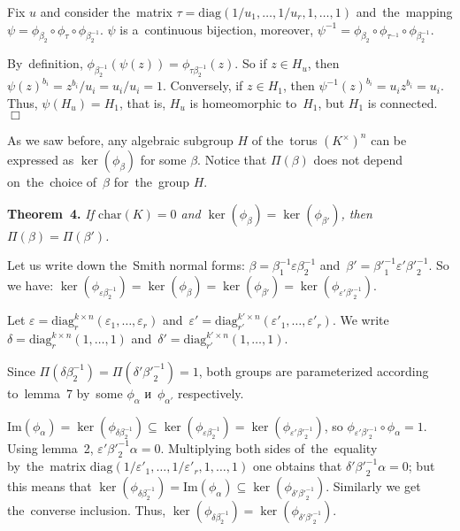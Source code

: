 \documentclass[twoside]{article}
\begin{document}
    Fix $u$ and consider the~matrix $\tau = \mathrm{diag}(1 / u_1, \ldots, 1 / u_r, 1, \ldots, 1)$
    and~the~mapping $\psi = \phi_{\beta_2} \circ \phi_\tau \circ \phi_{\beta_2^{-1}}$.
    $\psi$ is a~continuous bijection, moreover, $\psi^{-1} = \phi_{\beta_2} \circ \phi_{\tau^{-1}} \circ \phi_{\beta_2^{-1}}$.

    By~definition, $\phi_{\beta_2^{-1}}(\psi(z)) = \phi_{\tau \beta_2^{-1}}(z)$. So if $z \in H_u$,
    then $\psi(z)^{b_i} = z^{b_i} / u_i = u_i / u_i = 1$. Conversely, if $z \in H_1$, then $\psi^{-1}(z)^{b_i} = u_i z^{b_i} = u_i$.
    Thus, $\psi(H_u) = H_1$, that is, $H_u$ is homeomorphic to~$H_1$, but $H_1$ is connected.
\hfill$\Box$\medskip

As we saw before, any algebraic subgroup $H$ of the~torus $(K^\times)^n$ can be expressed as $\ker(\phi_\beta)$
for some $\beta$. Notice that $\Pi(\beta)$ does not depend on~the~choice of~$\beta$ for~the~group $H$.

\medskip\noindent\textbf{Theorem~4.}\emph{
    If $\mathrm{char}(K) = 0$ and $\ker(\phi_{\beta}) = \ker(\phi_{\beta'})$, then $\Pi(\beta) = \Pi(\beta')$.
}\medskip

    Let us write down the~Smith normal forms: $\beta = \beta_1^{-1} \varepsilon \beta_2^{-1}$
    and~$\beta' = {\beta'}_1^{-1} \varepsilon' {\beta'}_2^{-1}$. So we have: $\ker(\phi_{\varepsilon \beta_2^{-1}}) = \ker(\phi_{\beta}) = \ker(\phi_{\beta'}) = \ker(\phi_{\varepsilon' {\beta'}_2^{-1}})$.

    Let $\varepsilon = \mathrm{diag}^{k \times n}_r(\varepsilon_1, \ldots, \varepsilon_r)$
    and~$\varepsilon' = \mathrm{diag}^{k' \times n}_{r'}(\varepsilon'_1, \ldots, \varepsilon'_r)$.
    We write $\delta = \mathrm{diag}^{k \times n}_r(1, \ldots, 1)$ and~$\delta' = \mathrm{diag}^{k' \times n}_{r'}(1, \ldots, 1)$.

    Since $\Pi(\delta \beta_2^{-1}) = \Pi(\delta' {\beta'}_2^{-1}) = 1$, both groups are parameterized
    according to~lemma~7 by~some $\phi_\alpha$ и~$\phi_{\alpha'}$ respectively.

    $\mathrm{Im}(\phi_\alpha) = \ker(\phi_{\delta \beta_2^{-1}}) \subseteq \ker(\phi_{\varepsilon \beta_2^{-1}}) = \ker(\phi_{\varepsilon' {\beta'}_2^{-1}})$,
    so $\phi_{\varepsilon' {\beta'}_2^{-1}} \circ \phi_\alpha = 1$. Using lemma~2, $\varepsilon' {\beta'}_2^{-1} \alpha = 0$.
    Multiplying both sides of~the~equality by~the~matrix $\mathrm{diag}(1 / \varepsilon'_1, \ldots, 1 / \varepsilon'_r, 1, \ldots, 1)$
    one obtains that $\delta' {\beta'}_2^{-1} \alpha = 0$; but this means that $\ker(\phi_{\delta \beta_2^{-1}}) = \mathrm{Im}(\phi_\alpha) \subseteq \ker(\phi_{\delta' {\beta'}_2^{-1}})$.
    Similarly we get the~converse inclusion. Thus, $\ker(\phi_{\delta \beta_2^{-1}}) = \ker(\phi_{\delta' {\beta'}_2^{-1}})$.
\end{document}
